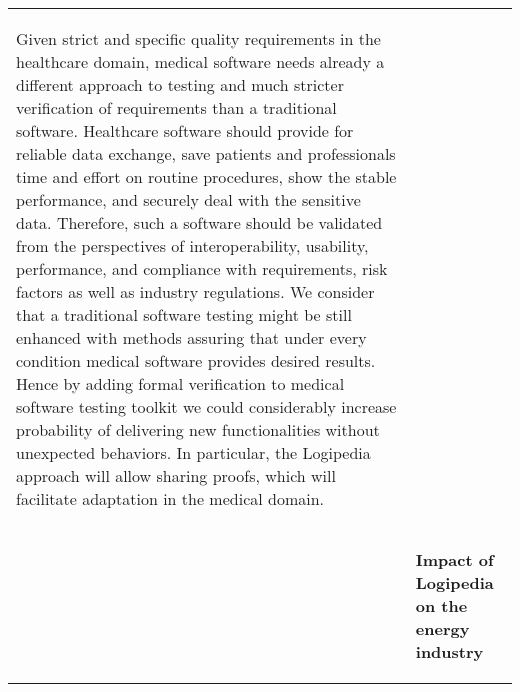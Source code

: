 \begin{longtable}{|p{}|p{}|}
\begin{framed}
Given strict and specific quality requirements in the healthcare
domain, medical software needs already a different approach to testing
and much stricter verification of requirements than a traditional
software. Healthcare software should provide for reliable data
exchange, save patients and professionals time and effort on routine
procedures, show the stable performance, and securely deal with the
sensitive data. Therefore, such a software should be validated from
the perspectives of interoperability, usability, performance, and
compliance with requirements, risk factors as well as industry
regulations. We consider that a traditional software testing might be
still enhanced with methods assuring that under every condition
medical software provides desired results. Hence by adding formal
verification to medical software testing toolkit we could considerably
increase probability of delivering new functionalities without
unexpected behaviors. In particular, the Logipedia approach will allow
sharing proofs, which will facilitate adaptation in the medical domain.


\end{framed}\\
&
\begin{framed}
{\bf \Large Impact of Logipedia on the energy industry}

\medskip


\end{framed}
\end{longtable}
